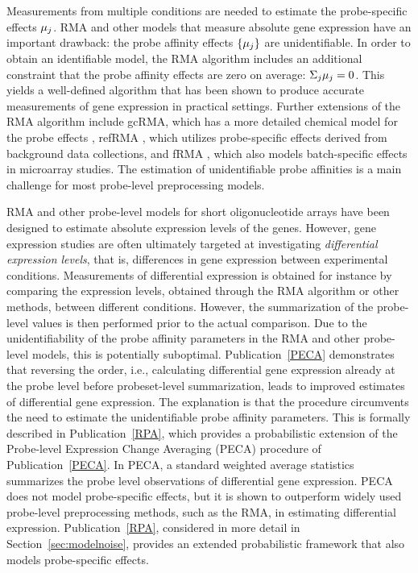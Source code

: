 Measurements from multiple conditions are needed to estimate the
probe-specific effects \(\mathbf{\mu}_j\). RMA and other models that measure
absolute gene expression have an important drawback: the probe
affinity effects \(\{\mathbf{\mu}_j\}\) are unidentifiable. In order to obtain
an identifiable model, the RMA algorithm includes an additional
constraint that the probe affinity effects are zero on average:
\(\Sigma_j\mathbf{\mu}_j = 0\). This yields a well-defined algorithm that has
been shown to produce accurate measurements of gene expression in
practical settings. Further extensions of the RMA algorithm include
gcRMA, which has a more detailed chemical model for the probe effects
\citep{Wu04}, refRMA \citep{Katz06}, which utilizes probe-specific
effects derived from background data collections, and fRMA
\citep{McCall2010}, which also models batch-specific effects in
microarray studies. The estimation of unidentifiable probe affinities
is a main challenge for most probe-level preprocessing models.

RMA and other probe-level models for short oligonucleotide arrays have
been designed to estimate absolute expression levels of the
genes. However, gene expression studies are often ultimately targeted
at investigating {\it differential expression levels}, that is,
differences in gene expression between experimental conditions.
Measurements of differential expression is obtained for instance by
comparing the expression levels, obtained through the RMA algorithm or
other methods, between different conditions.  However, the
summarization of the probe-level values is then performed prior to the
actual comparison. Due to the unidentifiability of the probe affinity
parameters in the RMA and other probe-level models, this is
potentially suboptimal. Publication~\ref{PECA} demonstrates that
reversing the order, i.e., calculating differential gene expression
already at the probe level before probeset-level summarization, leads
to improved estimates of differential gene expression. The explanation
is that the procedure circumvents the need to estimate the
unidentifiable probe affinity parameters. This is formally described
in Publication~\ref{RPA}, which provides a probabilistic extension of
the Probe-level Expression Change Averaging (PECA) procedure of Publication~\ref{PECA}. In PECA, a standard
weighted average statistics summarizes the probe level observations of
differential gene expression. PECA does not model probe-specific
effects, but it is shown to outperform widely used probe-level
preprocessing methods, such as the RMA, in estimating differential
expression. Publication~\ref{RPA}, considered in more detail in
Section~\ref{sec:modelnoise}, provides an extended probabilistic
framework that also models probe-specific effects.

